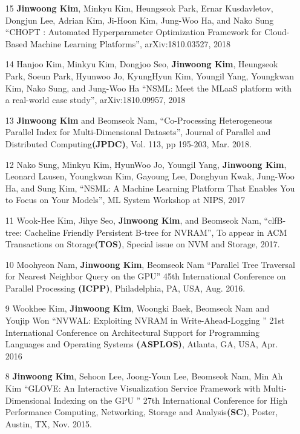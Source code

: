 \documentclass[margin,line]{res}
\begin{document}
\begin{resume}
{\begin{enumerate}
\item[15] {\bf Jinwoong Kim}, Minkyu Kim, Heungseok Park, Ernar Kusdavletov,
Dongjun Lee, Adrian Kim, Ji-Hoon Kim, Jung-Woo Ha, and Nako Sung ``CHOPT :
Automated Hyperparameter Optimization Framework for Cloud-Based Machine
Learning Platforms'', arXiv:1810.03527, 2018

\item[14] Hanjoo Kim, Minkyu Kim, Dongjoo Seo, {\bf Jinwoong Kim}, Heungseok Park, Soeun
Park, Hyunwoo Jo, KyungHyun Kim, Youngil Yang, Youngkwan Kim, Nako Sung, and
Jung-Woo Ha ``NSML: Meet the MLaaS platform with a real-world case study'',
arXiv:1810.09957, 2018

\item[13] {\bf Jinwoong Kim} and Beomseok Nam,
``Co-Processing Heterogeneous Parallel Index for Multi-Dimensional Datasets'',
Journal of Parallel and Distributed Computing{\bf(JPDC)}, Vol. 113, pp 195-203,
Mar. 2018.

\item[12] Nako Sung, Minkyu Kim, HyunWoo Jo, Youngil Yang, {\bf Jinwoong Kim},
Leonard Lausen, Youngkwan Kim, Gayoung Lee, Donghyun Kwak, Jung-Woo Ha, and
Sung Kim, ``NSML: A Machine Learning Platform That Enables You to Focus on Your
Models'', ML System Workshop at NIPS, 2017

\item[11] Wook-Hee Kim, Jihye Seo, {\bf Jinwoong Kim}, and Beomseok Nam,
``clfB-tree: Cacheline Friendly Persistent B-tree for NVRAM'', To appear in ACM
Transactions on Storage{\bf (TOS)}, Special issue on NVM and Storage, 2017.

\item[10] Moohyeon Nam, {\bf Jinwoong Kim}, Beomseok Nam ``Parallel Tree
Traversal for Nearest Neighbor Query on the GPU'' 45th International Conference
on Parallel Processing {\bf (ICPP)}, Philadelphia, PA, USA, Aug. 2016.

\item[9] Wookhee Kim, {\bf Jinwoong Kim}, Woongki Baek, Beomseok Nam and Youjip
Won ``NVWAL: Exploiting NVRAM in Write-Ahead-Logging '' 21st International
Conference on Architectural Support for Programming Languages and Operating
Systems {\bf(ASPLOS)}, Atlanta, GA, USA, Apr. 2016

\item[8] {\bf Jinwoong Kim}, Sehoon Lee, Joong-Youn Lee, Beomseok Nam, Min Ah
Kim ``GLOVE: An Interactive Visualization Service Framework with
Multi-Dimensional Indexing on the GPU '' 27th International Conference for High
Performance Computing, Networking, Storage and Analysis{\bf (SC)}, Poster,
Austin, TX, Nov. 2015.


\end{enumerate}}
\end{resume}
\end{document}
